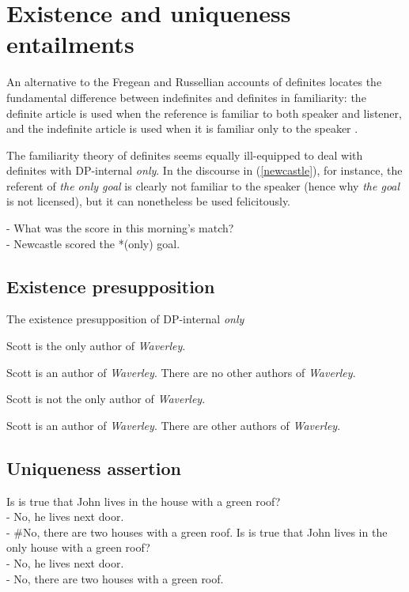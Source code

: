 \section{Existence and uniqueness entailments \label{sec:exist-unique}}

An alternative to the Fregean and Russellian accounts of definites locates the fundamental difference between indefinites and definites in familiarity: the definite article is used when the reference is familiar to both speaker and listener, and the indefinite article is used when it is familiar only to the speaker \citep{heim82}.

The familiarity theory of definites seems equally ill-equipped to deal with definites with DP-internal \textit{only}. In the discourse in (\ref{newcastle}), for instance, the referent of \textit{the only goal} is clearly not familiar to the speaker (hence why \textit{the goal} is not licensed), but it can nonetheless be used felicitously.

\begin{exe}
	\ex \label{newcastle} - What was the score in this morning's match? \\
	    - Newcastle scored the *(only) goal.
\end{exe}

\subsection{Existence presupposition}
The existence presupposition of DP-internal \textit{only}

\begin{exe}
	\ex Scott is the only author of \textit{Waverley}.
		\begin{xlist}
			\ex Scott is an author of \textit{Waverley}.
			\ex There are no other authors of \textit{Waverley}.
		\end{xlist}
	\ex Scott is not the only author of \textit{Waverley}.
		\begin{xlist}
			\ex Scott is an author of \textit{Waverley}.
			\ex There are other authors of \textit{Waverley}.
		\end{xlist}
\end{exe}

\subsection{Uniqueness assertion}

\begin{exe}
	\ex Is is true that John lives in the house with a green roof? \\
	    - No, he lives next door. \\
	    - \#No, there are two houses with a green roof.
	\ex Is is true that John lives in the only house with a green roof? \\
	    - No, he lives next door. \\
	    - No, there are two houses with a green roof.
\end{exe}

